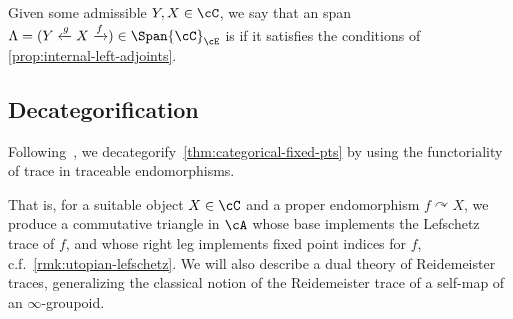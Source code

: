 \begin{defn}
    Given some admissible $Y,X\in \cC$, we say that an span $\Lambda=(Y\xleftarrow{g} X \xrightarrow{f}) \in \Span{\cC}_{\cE}$ is
     if it satisfies the conditions of \cref{prop:internal-left-adjoints}.
\end{defn}

\subsection{Decategorification}

Following~\cite{Kondyrev_Prikhodko2020,Ben-Zvi_Nadler2021}, we decategorify~\cref{thm:categorical-fixed-pts} by using the functoriality of trace in traceable endomorphisms.

That is, for a suitable object $X\in\cC$ and a proper endomorphism $f\curvearrowright X$, we produce a commutative triangle in $\cA$ whose base implements the Lefschetz trace of $f$, and whose right leg implements fixed point indices for $f$, c.f.~\cref{rmk:utopian-lefschetz}. We will also describe a dual theory of Reidemeister traces, generalizing the classical notion of the Reidemeister trace of a self-map of an $\infty$-groupoid.

